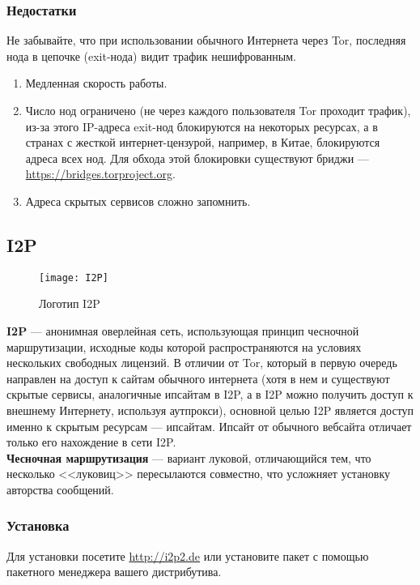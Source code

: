 \subsubsection{Недостатки}
\begin{important}
Не забывайте, что при использовании обычного Интернета через Tor, последняя нода в цепочке (exit-нода) видит трафик нешифрованным.
\end{important}
\begin{enumerate}
\item Медленная скорость работы.
\item Число нод ограничено (не через каждого пользователя Tor проходит трафик), из-за этого IP-адреса exit-нод блокируются на некоторых ресурсах, а в странах с жесткой интернет-цензурой, например, в Китае, блокируются адреса всех нод. Для обхода этой блокировки существуют бриджи --- \url{https://bridges.torproject.org}.
\item Адреса скрытых сервисов сложно запомнить.
\end{enumerate}
\subsection{I2P}
\begin{wrapfigure}[6]{r}{0.25\linewidth}
\texttt{[image: I2P]}
\caption{Логотип I2P}
\end{wrapfigure}
\textbf{I2P} --- анонимная оверлейная сеть, использующая принцип чесночной маршрутизации, исходные коды которой распространяются на условиях нескольких свободных лицензий\cite{i2p_license}. В отличии от Tor, который в первую очередь направлен на доступ к сайтам обычного интернета (хотя в нем и существуют скрытые сервисы, аналогичные ипсайтам в I2P, а в I2P можно получить доступ к внешнему Интернету, используя аутпрокси), основной целью I2P является доступ именно к скрытым ресурсам --- ипсайтам. Ипсайт от обычного вебсайта отличает только его нахождение в сети I2P.\\
\textbf{Чесночная маршрутизация} --- вариант луковой, отличающийся тем, что несколько <<луковиц>> пересылаются совместно, что усложняет установку авторства сообщений.
\subsubsection{Установка}
Для установки посетите \url{http://i2p2.de} или установите пакет с помощью пакетного менеджера вашего дистрибутива.

